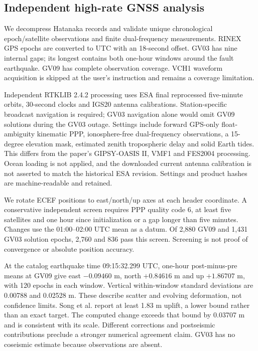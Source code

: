 \documentclass[11pt]{article}
\begin{document}
\subsection{Independent high-rate GNSS analysis}
We decompress Hatanaka records and validate unique chronological epoch/satellite observations and finite dual-frequency measurements. RINEX GPS epochs are converted to UTC with an 18-second offset. GV03 has nine internal gaps; its longest contains both one-hour windows around the fault earthquake. GV09 has complete observation coverage. VCH1 waveform acquisition is skipped at the user's instruction and remains a coverage limitation.

Independent RTKLIB 2.4.2 processing \citep{rtklib} uses ESA final reprocessed five-minute orbits, 30-second clocks and IGS20 antenna calibrations. Station-specific broadcast navigation is required; GV03 navigation alone would omit GV09 solutions during the GV03 outage. Settings include forward GPS-only float-ambiguity kinematic PPP, ionosphere-free dual-frequency observations, a 15-degree elevation mask, estimated zenith tropospheric delay and solid Earth tides. This differs from the paper's GIPSY-OASIS II, VMF1 and FES2004 processing. Ocean loading is not applied, and the downloaded current antenna calibration is not asserted to match the historical ESA revision. Settings and product hashes are machine-readable and retained.

We rotate ECEF positions to east/north/up axes at each header coordinate. A conservative independent screen requires PPP quality code 6, at least five satellites and one hour since initialization or a gap longer than five minutes. Changes use the 01:00--02:00 UTC mean as a datum. Of 2,880 GV09 and 1,431 GV03 solution epochs, 2,760 and 836 pass this screen. Screening is not proof of convergence or absolute position accuracy.

At the catalog earthquake time 09:15:32.299 UTC, one-hour post-minus-pre means at GV09 give east $-0.09460$ m, north $+0.84616$ m and up $+1.86707$ m, with 120 epochs in each window. Vertical within-window standard deviations are 0.00788 and 0.02528 m. These describe scatter and evolving deformation, not confidence limits. Song et al. report at least 1.83 m uplift, a lower bound rather than an exact target. The computed change exceeds that bound by 0.03707 m and is consistent with its scale. Different corrections and postseismic contributions preclude a stronger numerical agreement claim. GV03 has no coseismic estimate because observations are absent.
\end{document}
